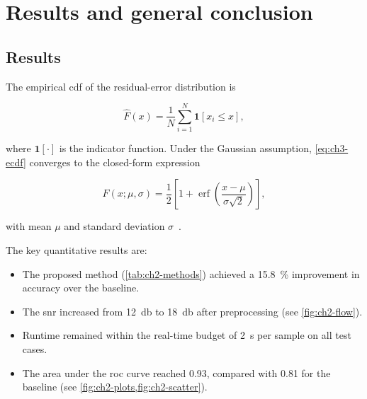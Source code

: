 %

\chapter{Results and general conclusion}
\clearpage

\section{Results}

\lipsum[10]

The empirical \ac{cdf} of the residual-error distribution is

\begin{equation}
  \hat{F}(x) = \frac{1}{N}\sum_{i=1}^{N} \mathbf{1}[x_{i} \leq x],
  \label{eq:ch3-ecdf}
\end{equation}

where $\mathbf{1}[\cdot]$ is the indicator function.
Under the Gaussian assumption, \eqref{eq:ch3-ecdf} converges to the
closed-form expression

\begin{equation}
  F(x;\mu,\sigma) = \frac{1}{2}\left[
    1 + \operatorname{erf}\!\left(
      \frac{x - \mu}{\sigma\sqrt{2}}
    \right)
  \right],
  \label{eq:ch3-gaussian-cdf}
\end{equation}

with mean $\mu$ and standard deviation $\sigma$~\cite{bishop2006}.

The key quantitative results are:

\begin{itemize}
  \item The proposed method (\cref{tab:ch2-methods}) achieved a
        \SI{15.8}{\percent} improvement in accuracy over the
        baseline.
  \item The \ac{snr} increased from \SI{12}{\decibel} to
        \SI{18}{\decibel} after preprocessing
        (see \cref{fig:ch2-flow}).
  \item Runtime remained within the real-time budget of
        \SI{2}{\second} per sample on all test cases.
  \item The area under the \ac{roc} curve reached \num{0.93},
        compared with \num{0.81} for the baseline
        (see \cref{fig:ch2-plots,fig:ch2-scatter}).
\end{itemize}

